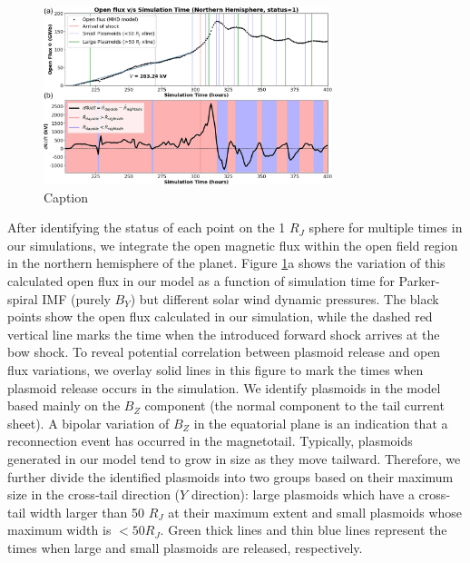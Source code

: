 \begin{figure}
    \centering
    \includegraphics[width=0.75\textwidth]{images4/open-flux-time.jpg}
    \caption{Caption}
    \label{fig:open-flux-time}
\end{figure}

After identifying the status of each point on the 1 $R_J$ sphere for multiple times in our simulations, we integrate the open magnetic flux within the open field region in the northern hemisphere of the planet. Figure \ref{fig:open-flux-time}a shows the variation of this calculated open flux in our model as a function of simulation time for Parker‐spiral IMF (purely $B_Y$) but different solar wind dynamic pressures. The black points show the open flux calculated in our simulation, while the dashed red vertical line marks the time when the introduced forward shock arrives at the bow shock. To reveal potential correlation between plasmoid release and open flux variations, we overlay solid lines in this figure to mark the times when plasmoid release occurs in the simulation. We identify plasmoids in the model based mainly on the $B_Z$ component (the normal component to the tail current sheet). A bipolar variation of $B_Z$ in the equatorial plane is an indication that a reconnection event has occurred in the magnetotail. Typically, plasmoids generated in our model tend to grow in size as they move tailward. Therefore, we further divide the identified plasmoids into two groups based on their maximum size in the cross‐tail direction ($Y$ direction): large plasmoids which have a cross‐tail width larger than 50 $R_J$ at their maximum extent and small plasmoids whose maximum width is $<50 R_J$. Green thick lines and thin blue lines represent the times when large and small plasmoids are released, respectively.

